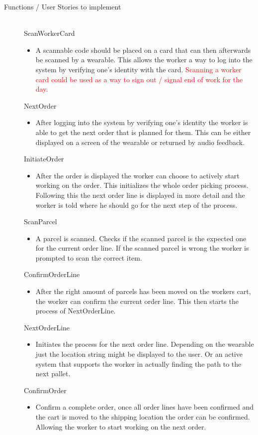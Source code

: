 \documentclass[a4paper]{report}
\newcommand{\itemizeOne}[1]{\begin{itemize}\item {#1}\end{itemize}}
\begin{document}
\begin{description}
	 \item[Functions / User Stories to implement] \hfill \\
	 ScanWorkerCard
	 \itemizeOne{A scannable code should be placed on a card that can then afterwards be scanned by a wearable. This allows the worker a way to log into the system by verifying one's identity with the card. \textcolor{red}{Scanning a worker card could be used as a way to sign out / signal end of work for the day.}}
	 NextOrder
	 \itemizeOne{After logging into the system by verifying one's identity the worker is able to get the next order that is planned for them. This can be either displayed on a screen of the wearable or returned by audio feedback. }
	 InitiateOrder
	 \itemizeOne{After the order is displayed the worker can choose to actively start working on the order. This initializes the whole order picking process. Following this the next order line is displayed in more detail and the worker is told where he should go for the next step of the process.}
	 ScanParcel
	 \itemizeOne{A parcel is scanned. Checks if the scanned parcel is the expected one for the current order line. If the scanned parcel is wrong the worker is prompted to scan the correct item.}
	 ConfirmOrderLine
	 \itemizeOne{After the right amount of parcels has been moved on the workers cart, the worker can confirm the current order line. This then starts the process of NextOrderLine.}
	 NextOrderLine
	 \itemizeOne{Initiates the process for the next order line. Depending on the wearable just the location string might be displayed to the user. Or an active system that supports the worker in actually finding the path to the next pallet.}
	 ConfirmOrder
	 \itemizeOne{Confirm a complete order, once all order lines have been confirmed and the cart is moved to the shipping location the order can be confirmed. Allowing the worker to start working on the next order.}
\end{description}
\end{document}
